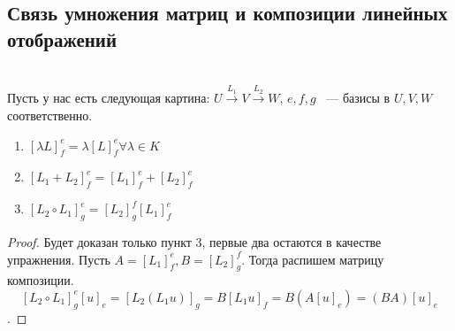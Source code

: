 \subsection{Связь умножения матриц и композиции линейных отображений}
\begin{statement}\leavevmode\\
    Пусть у нас есть следующая картина: $U\xrightarrow{L_1} V \xrightarrow{L_2} W$, $e, f, g$ 
    ~--- базисы в $U, V, W$ соответственно.
    \begin{enumerate}
        \item $[\lambda L]^e_f=\lambda[L]^e_f \forall \lambda\in K$ 
        \item $[L_1 + L_2]^e_f = [L_1]^e_f + [L_2]^e_f$ 
        \item $[L_2\circ L_1]^e_g = [L_2]^f_g[L_1]^e_f$
    \end{enumerate}
\end{statement}
\begin{proof}
    Будет доказан только пункт 3, первые два остаются в качестве упражнения.
    Пусть $A = [L_1]^e_f, B = [L_2]^f_g$. Тогда распишем матрицу композиции.
    $$[L_2\circ L_1]^e_g[u]_e= [L_2(L_1u)]_g = B[L_1u]_f = B(A[u]_e) = (BA)[u]_e$$.
\end{proof}

